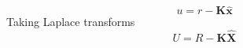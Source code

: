 \[
u = r - \mathbf{K}\hat{\mathbf{x}}
\]
Taking Laplace transforms
\[
U = R - \mathbf{K}\hat{\mathbf{X}}
\]

\endinput

